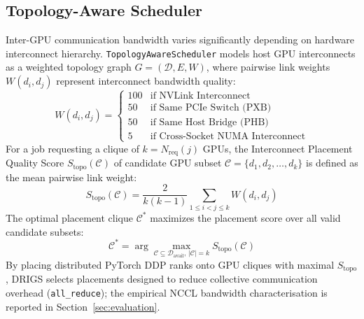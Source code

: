 \subsection{Topology-Aware Scheduler}
Inter-GPU communication bandwidth varies significantly depending on hardware interconnect hierarchy. \texttt{TopologyAwareScheduler} models host GPU interconnects as a weighted topology graph $G = (\mathcal{D}, E, W)$, where pairwise link weights $W(d_i, d_j)$ represent interconnect bandwidth quality:
\begin{equation}
    W(d_i, d_j) = \begin{cases}
        100 & \text{if NVLink Interconnect} \\
        50  & \text{if Same PCIe Switch (PXB)} \\
        50  & \text{if Same Host Bridge (PHB)} \\
        5   & \text{if Cross-Socket NUMA Interconnect}
    \end{cases}
\end{equation}
For a job requesting a clique of $k = N_{\text{req}}(j)$ GPUs, the Interconnect Placement Quality Score $S_{\text{topo}}(\mathcal{C})$ of candidate GPU subset $\mathcal{C} = \{d_1, d_2, \dots, d_k\}$ is defined as the mean pairwise link weight:
\begin{equation}
    S_{\text{topo}}(\mathcal{C}) = \frac{2}{k(k-1)} \sum_{1 \le i < j \le k} W(d_i, d_j)
\end{equation}
The optimal placement clique $\mathcal{C}^*$ maximizes the placement score over all valid candidate subsets:
\begin{equation}
    \mathcal{C}^* = \arg\max_{\mathcal{C} \subseteq \mathcal{D}_{\text{avail}}, \, |\mathcal{C}| = k} S_{\text{topo}}(\mathcal{C})
\end{equation}
By placing distributed PyTorch DDP ranks onto GPU cliques with maximal $S_{\text{topo}}$, DRIGS selects placements designed to reduce collective communication overhead (\texttt{all\_reduce}); the empirical NCCL bandwidth characterisation is reported in Section~\ref{sec:evaluation}.
